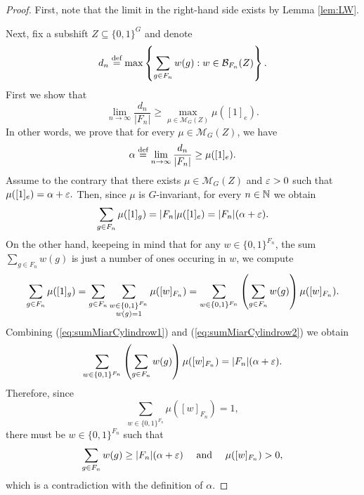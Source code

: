 \begin{proof}
First, note that the limit in the right-hand side exists by Lemma \ref{lem:LW}.

Next, fix a subshift $Z\subseteq\{0,1\}^G$ and denote 
\[
d_n\stackrel{\textup{def}}{=}\max\left\{\sum_{g\in F_n} w(g): w\in \mathcal B_{F_n}(Z)\right\}.
\]
First we show that 
\[
\lim_{n\to\infty}\frac{d_n}{|F_n|} \geq \max_{\mu\in\mathcal{M}_G(Z)}\mu([1]_e).
\]
In other words, we prove that for every $\mu\in\mathcal{M}_G(Z)$, we have
\[
\alpha\stackrel{\textup{def}}{=}\lim_{n\to\infty}\frac{d_n}{|F_n|} \geq\mu([1]_e).
\]
Assume to the contrary that there exists $\mu\in\mathcal{M}_G(Z)$ and $\varepsilon>0$ such that 
$
\mu([1]_e)=\alpha+\varepsilon.
$
Then, since $\mu$ is  $G$-invariant, for every $n\in\mathbb{N}$ we obtain
\begin{equation}\label{eq:sumMiarCylindrow1}
\sum_{g\in F_n}\mu([1]_g) = |F_n|\mu([1]_e) = |F_n|(\alpha+\varepsilon).
\end{equation}
On the other hand, keepeing in mind that for any $w\in\{0,1\}^{F_n}$, the sum $\sum_{g\in F_n} w(g)$ is just a number of ones occuring in $w$, we compute
\begin{equation}\label{eq:sumMiarCylindrow2}
\sum_{g\in F_n}\mu([1]_g)= \sum_{g\in F_n}\sum_{\substack{w\in\{0,1\}^{F_n}\\ w(g)=1}}\mu([w]_{F_n})= \sum_{w\in\{0,1\}^{F_n}} \left(\sum_{g\in F_n}w(g)\right)\mu([w]_{F_n}).
\end{equation}
Combining (\ref{eq:sumMiarCylindrow1}) and (\ref{eq:sumMiarCylindrow2}) we obtain
\[
\sum_{w\in\{0,1\}^{F_n}} \left(\sum_{g\in F_n}w(g)\right)\mu([w]_{F_n}) = |F_n|(\alpha+\varepsilon).
\]
Therefore, since 
\[
\sum_{w\in\{0,1\}^{F_n}}\mu([w]_{F_n}) = 1,
\]
there must be $w\in \{0,1\}^{F_n}$ such that 
\[
\sum_{g\in F_n}w(g)\geq |F_n|(\alpha+\varepsilon) \quad \text{ and } \quad \mu([w]_{F_n})>0,
\]
which is a contradiction with the definition of $\alpha$.


\end{proof}
